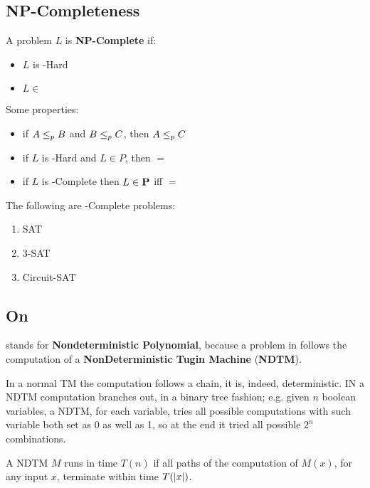 \subsection{NP-Completeness}\label{subsec:np_completeness}
    A problem $L$ is \textbf{NP-Complete} if:
    \begin{itemize}
        \item $L$ is \NP-Hard
        \item $L \in$ \NP
    \end{itemize}

    Some properties:
    \begin{itemize}
        \item if $A \leq_p B$ and $B \leq_p C$, then $A \leq_p C$
        \item if $L$ is \NP-Hard and $L \in P$, then \PP $=$ \NP
        \item if $L$ is \NP-Complete then $L \in \textbf{P}$ iff \PP $=$ \NP
    \end{itemize}

    \begin{theorem}\label{thm:cook_levin}
        The following are \NP-Complete problems:
        \begin{enumerate}
            \item SAT
            \item 3-SAT
            \item Circuit-SAT
        \end{enumerate}
    \end{theorem}


\subsection{On \NP}\label{subsec:on_np}
    \NP{} stands for \textbf{Nondeterministic Polynomial}, because a problem in \NP{} follows the computation of a \textbf{NonDeterministic Tugin Machine} (\textbf{NDTM}).

    In a normal TM the computation follows a chain, it is, indeed, deterministic. IN a NDTM computation branches out, in a binary tree fashion; e.g. given $n$ boolean variables, a NDTM, for each variable, tries all possible computations with such variable both set as $0$ as well as 1, so at the end it tried all possible $2^n$ combinations.

    A NDTM $M$ runs in time $T(n)$ if all paths of the computation of $M(x)$, for any input $x$, terminate within time $T(\vert x \vert)$.

